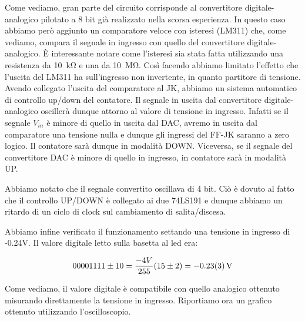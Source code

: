 Come vediamo, gran parte del circuito corrisponde al convertitore digitale-analogico pilotato a 8 bit già realizzato nella scorsa esperienza.
In questo caso abbiamo però aggiunto un comparatore veloce con isteresi (LM311) che, come vediamo, compara il segnale in ingresso con quello del convertitore digitale-analogico.
È interessante notare come l'isteresi sia stata fatta utilizzando una resistenza da \SI{10}{\kilo\ohm} e una da \SI{10}{\mega\ohm}.
Così facendo abbiamo limitato l'effetto che l'uscita del LM311 ha sull'ingresso non invertente, in quanto partitore di tensione.
Avendo collegato l'uscita del comparatore al JK, abbiamo un sistema automatico di controllo up/down del contatore.
Il segnale in uscita dal convertitore digitale-analogico oscillerà dunque attorno al valore di tensione in ingresso.
Infatti se il segnale $V_{in}$ è minore di quello in uscita dal DAC, avremo in uscita dal comparatore una tensione nulla e dunque gli ingressi del FF-JK saranno a zero logico.
Il contatore sarà  dunque in modalità DOWN.
Viceversa, se il segnale del convertitore DAC è minore di quello in ingresso, in contatore sarà in modalità UP. 

Abbiamo notato che il segnale convertito oscillava di 4 bit.
Ciò è dovuto al fatto che il controllo UP/DOWN è collegato ai due 74LS191 e dunque abbiamo un ritardo di un ciclo di clock sul cambiamento di salita/discesa.

Abbiamo infine verificato il funzionamento settando una tensione in ingresso di -0.24V.
Il valore digitale letto sulla basetta al led era:

$$00001111\pm10=\frac{-4 V}{255}(15\pm2)=\SI{-0.23\pm0.03}{\V}$$

Come vediamo, il valore digitale è compatibile con quello analogico ottenuto misurando direttamente la tensione in ingresso. Riportiamo ora un grafico ottenuto utilizzando l'oscilloscopio.

